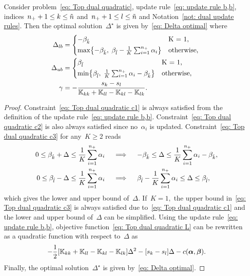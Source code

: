\begin{proposition}\label{prop: toppushk family quadratic update b,b}
  Consider problem~\eqref{eq: Top dual quadratic}, update rule~\eqref{eq: update rule b,b}, indices~$n_{+} + 1 \leq k \leq \tilde{n}$ and~$n_{+} + 1 \leq l \leq \tilde{n}$  and Notation~\ref{not: dual update rules}. Then the optimal solution~$\Delta^{\star}$ is given by~\eqref{eq: Delta optimal} where
  \begin{align*}
    \Delta_{lb} & = 
      \begin{cases*}
        -\betak & K = 1, \\
        \max \Brac[c]{- \betak,\; \betal - \frac{1}{K} \sum_{i = 1}^{\npos} \alpha_i} & \textrm{otherwise},
      \end{cases*} \\
    \Delta_{ub} & = 
      \begin{cases*}
        \betal & K = 1, \\
        \min \Brac[c]{\betal,\; \frac{1}{K} \sum_{i = 1}^{\npos} \alpha_i - \betak} & \textrm{otherwise},
      \end{cases*} \\
    \gamma & = -\frac{s_k - s_l}{\K_{kk} + \K_{ll} - \K_{kl} - \K_{lk}}.
  \end{align*}
\end{proposition}

\begin{proof}
  Constraint~\eqref{eq: Top dual quadratic c1} is always satisfied from the definition of the update rule~\eqref{eq: update rule b,b}. Constraint~\eqref{eq: Top dual quadratic c2} is also always satisfied since no~$\alpha_i$ is updated. Constraint~\eqref{eq: Top dual quadratic c3} for any~$K \geq 2$ reads
  \begin{align*}
    0 \leq \beta_{\hat{k}} + \Delta \leq \frac{1}{K} \sum_{i = 1}^{n_{+}} \alpha_i 
    & \quad \implies \quad
    -\beta_{\hat{k}} \leq \Delta \leq \frac{1}{K} \sum_{i = 1}^{n_{+}} \alpha_i - \beta_{\hat{k}}, \\
    0 \leq \beta_{\hat{l}} - \Delta \leq \frac{1}{K} \sum_{i = 1}^{n_{+}} \alpha_i
    & \quad \implies \quad
    \beta_{\hat{l}} - \frac{1}{K} \sum_{i = 1}^{n_{+}} \alpha_i \leq \Delta \leq \beta_{\hat{l}},
  \end{align*}
  which gives the lower and upper bound of~$\Delta.$ If~$K = 1,$ the upper bound in~\eqref{eq: Top dual quadratic c3} is always satisfied due to~\eqref{eq: Top dual quadratic c1} and the lower and upper bound of~$\Delta$ can be simplified. Using the update rule~\eqref{eq: update rule b,b}, objective function~\eqref{eq: Top dual quadratic L} can be rewritten as a quadratic function with respect to~$\Delta$ as
  \begin{equation*}
    - \frac{1}{2} \Brac[s]{\K_{kk} + \K_{ll} - \K_{kl} - \K_{lk}} \Delta^2
    - \Brac[s]{s_k - s_l} \Delta
    - c(\bm{\alpha}, \bm{\beta}).
  \end{equation*}
  Finally, the optimal solution~$\Delta^{\star}$ is given by~\eqref{eq: Delta optimal}.
\end{proof}

